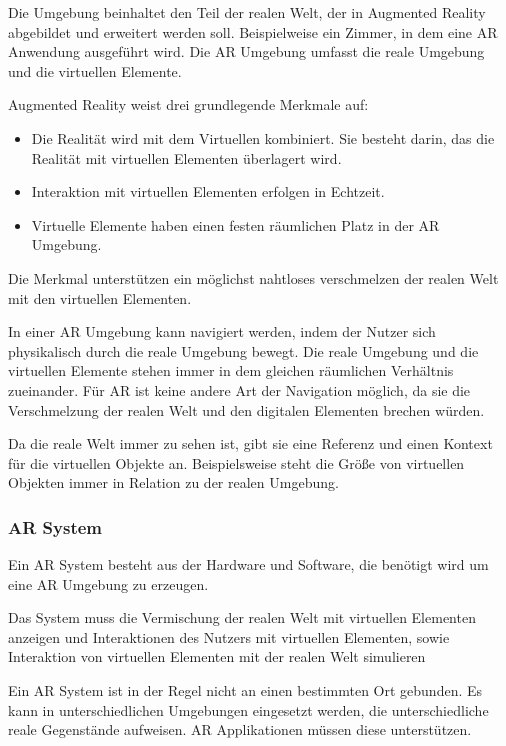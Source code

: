 Die Umgebung beinhaltet den Teil der realen Welt, der in Augmented Reality abgebildet und erweitert werden soll. Beispielweise ein Zimmer, in dem eine AR Anwendung ausgeführt wird.
Die AR Umgebung umfasst die reale Umgebung und die virtuellen Elemente.

Augmented Reality weist drei grundlegende Merkmale auf: 
\begin{itemize}
	\item Die Realität wird mit dem Virtuellen kombiniert. Sie besteht darin, das die Realität mit virtuellen Elementen überlagert wird.
	\item Interaktion mit virtuellen Elementen erfolgen in Echtzeit.
	\item Virtuelle Elemente haben einen festen räumlichen Platz in der AR Umgebung.
\end{itemize}

Die Merkmal unterstützen ein möglichst nahtloses verschmelzen der realen Welt mit den virtuellen Elementen.

In einer AR Umgebung kann navigiert werden, indem der Nutzer sich physikalisch durch die reale Umgebung bewegt. Die reale Umgebung und die virtuellen Elemente stehen immer in dem gleichen räumlichen Verhältnis zueinander. Für AR ist keine andere Art der Navigation möglich, da sie die Verschmelzung der realen Welt und den digitalen Elementen brechen würden.

Da die reale Welt immer zu sehen ist, gibt sie eine Referenz und einen Kontext für die virtuellen Objekte an. 
Beispielsweise steht die Größe von virtuellen Objekten immer in Relation zu der realen Umgebung.\citep{GrundlagenAR}


\subsubsection{AR System}

Ein AR System besteht aus der Hardware und Software, die benötigt wird um eine AR Umgebung zu erzeugen.

Das System muss die Vermischung der realen Welt mit virtuellen Elementen anzeigen und Interaktionen des Nutzers mit virtuellen Elementen, sowie Interaktion von virtuellen Elementen mit der realen Welt simulieren

Ein AR System ist in der Regel nicht an einen bestimmten Ort gebunden. Es kann in unterschiedlichen Umgebungen eingesetzt werden, die unterschiedliche reale Gegenstände aufweisen. AR Applikationen müssen diese unterstützen.\citep{GrundlagenAR}

